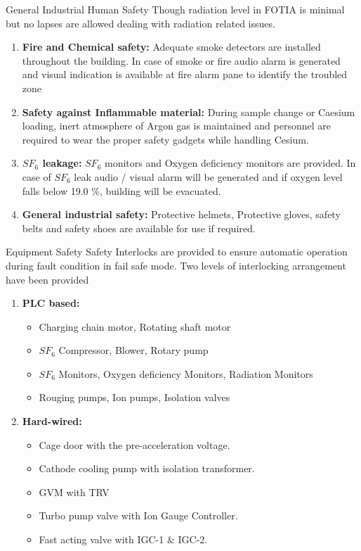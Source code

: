 \documentclass[11pt]{beamer}
\begin{document}
\begin{frame}{General Industrial Human Safety}
Though radiation level in FOTIA is minimal but no lapses are allowed dealing with radiation related issues.
\begin{enumerate} 
 \item \textbf{Fire and Chemical safety:}
  Adequate  smoke detectors are installed  throughout the building. In case of smoke or fire audio alarm is generated and visual indication is available at fire alarm pane to identify the troubled zone
 \item \textbf{Safety against Inflammable material:}
 During sample change or Caesium loading, inert atmosphere of Argon gas is maintained and personnel are required to wear the proper safety gadgets while handling Cesium.
 \item \textbf{$SF_6$ leakage:}
 $SF_6$ monitors and Oxygen deficiency monitors are provided. In case of $SF_6$  leak audio / visual alarm will be generated and if oxygen level falls below 19.0 \%,  building  will be evacuated.
\item \textbf{General industrial safety:}
Protective helmets, Protective gloves, safety belts and safety shoes are available for use if required.
\end{enumerate}		
	 
 
\end{frame}


\begin{frame}{Equipment Safety}
Safety Interlocks are provided to ensure automatic operation during fault condition in fail safe mode. Two levels of interlocking arrangement have been provided 
\begin{enumerate} 
 \item \textbf{PLC based:}
  \begin{itemize}
  \item  Charging chain  motor, Rotating shaft motor
  \item  $SF_6$  Compressor, Blower, Rotary pump
  \item  $SF_6$  Monitors, Oxygen deficiency Monitors, Radiation Monitors
  \item  Rouging pumps, Ion pumps, Isolation valves 
  \end{itemize} 
 \item \textbf{Hard-wired:}
\begin{itemize}
\item  Cage door with the pre-acceleration voltage.
\item  Cathode cooling pump with isolation transformer.
\item GVM with TRV
\item  Turbo pump valve with Ion Gauge Controller.
\item Fast acting valve with IGC-1 \& IGC-2.
\end{itemize} 
\end{enumerate}		
	 
 
\end{frame}
\end{document}
